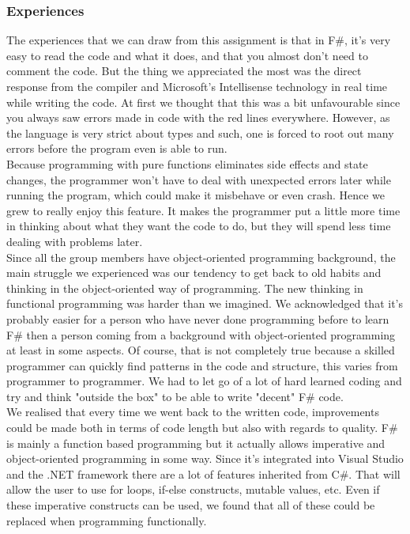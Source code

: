 \documentclass[12pt, a4paper]{article}
\begin{document}
\newpage

\subsubsection{Experiences}
The experiences that we can draw from this assignment is that in F\#, it's very easy to read the code and what it does, and that you almost don't need to comment the code. But the thing we appreciated the most was the direct response from the compiler and Microsoft's Intellisense technology in real time while writing the code. At first we thought that this was a bit unfavourable since you always saw errors made in code with the red lines everywhere. However, as the language is very strict about types and such, one is forced to root out many errors before the program even is able to run.\\

Because programming with pure functions eliminates side effects and state changes, the programmer won't have to deal with unexpected errors later while running the program, which could make it misbehave or even crash. Hence we grew to really enjoy this feature. It makes the programmer put a little more time in thinking about what they want the code to do, but they will spend less time dealing with problems later.\\

Since all the group members have object-oriented programming background, the main struggle we experienced was our tendency to get back to old habits and thinking in the object-oriented way of programming. The new thinking in functional programming was harder than we imagined. We acknowledged that it's probably easier for a person who have never done programming before to learn F\# then a person coming from a background with object-oriented programming at least in some aspects. Of course, that is not completely true because a skilled programmer can quickly find patterns in the code and structure, this varies from programmer to programmer. We had to let go of a lot of hard learned coding and try and think "outside the box" to be able to write "decent" F\# code.\\

We realised that every time we went back to the written code, improvements could be made both in terms of code length but also with regards to quality. F\# is mainly a function based programming but it actually allows imperative and object-oriented programming in some way. Since it's integrated into Visual Studio and the .NET framework there are a lot of features inherited from C\#. That will allow the user to use for loops, if-else constructs, mutable values, etc. Even if these imperative constructs can be used, we found that all of these could be replaced when programming functionally.\\
\end{document}
